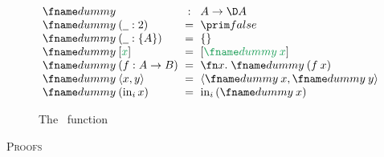 \documentclass[nomarginums]{rntz}\usepackage[tablet]{fantasy}%
\begin{document}




\begin{figure*}
  \[\setlength\arraycolsep{.3em}\begin{array}{lcl}
    \dummy &:& A \to \D A\\
    \dummy \<(\pwild : \tbool) &=& \efalse\\
    \dummy \<(\pwild : \tset{A}) &=& \eset{}\\
    \dummy \<\eboxd{x} &=& \eboxd{\dummy\<x}\\
    \dummy \<(f : A \to B) &=& \fnof{x} \dummy\<(f\<x)\\
    \dummy \<\etuple{x,y} &=& \etuple{\dummy\<x, \dummy\<y}\\
    \dummy \<(\inj i x) &=& \inj i (\dummy\<x)
  \end{array}\]
  \caption{The \dummy\ function}
  \label{fig:dummy}
\end{figure*}


\clearpage
\appendix
\begin{center}\Large\scshape Proofs\end{center}
\end{document}

